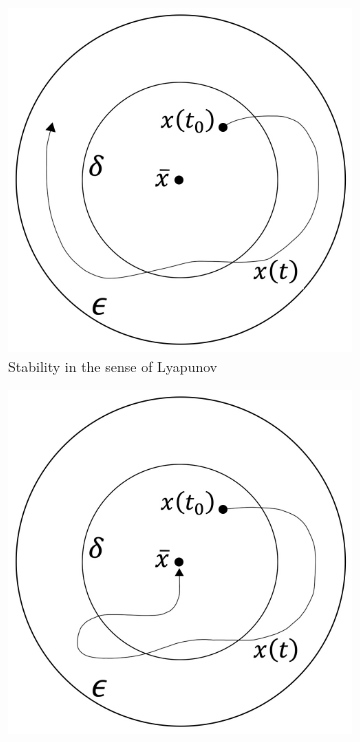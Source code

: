 \begin{figure}
  \centering
  \begin{subfigure}{0.31\textwidth}
    \centering
    \includegraphics[width=\linewidth]{figures/figure-SISL.jpg}
    \caption{Stability in the sense of Lyapunov} \label{fig:SISL}
  \end{subfigure}
  \hspace*{\fill} %
  \begin{subfigure}{0.31\textwidth}
    \centering
    \includegraphics[width=\linewidth]{figures/figure-AS.jpg}

\end{subfigure}
\end{figure}
